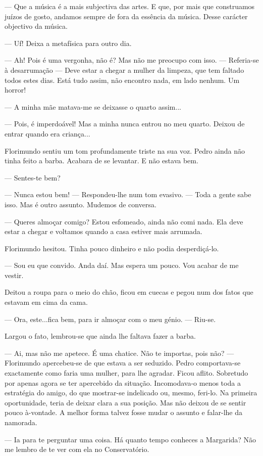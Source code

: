 --- Que a música é a mais subjectiva das artes. E que, por mais que
construamos juízos de gosto, andamos sempre de fora da essência da
música. Desse carácter objectivo da música.

--- Uf! Deixa a metafísica para outro dia.

--- Ah! Pois é uma vergonha, não é? Mas não me preocupo com isso. --- 
Referia-se à desarrumação --- Deve estar a chegar a mulher da limpeza, que
tem faltado todos estes dias. Está tudo assim, não encontro nada, em
lado nenhum. Um horror!

--- A minha mãe matava-me se deixasse o quarto assim...

--- Pois, é imperdoável! Mas a minha nunca entrou no meu quarto. Deixou de
entrar quando era criança...

Florimundo sentiu um tom profundamente triste na sua voz. Pedro ainda
não tinha feito a barba. Acabara de se levantar. E não estava bem.

--- Sentes-te bem?

--- Nunca estou bem! --- Respondeu-lhe num tom evasivo. --- Toda a gente sabe
isso. Mas é outro assunto. Mudemos de conversa.

--- Queres almoçar comigo? Estou esfomeado, ainda não comi nada. Ela deve
estar a chegar e voltamos quando a casa estiver mais arrumada.

Florimundo hesitou. Tinha pouco dinheiro e não podia desperdiçá-lo.

--- Sou eu que convido. Anda daí. Mas espera um pouco. Vou acabar de me
vestir.

Deitou a roupa para o meio do chão, ficou em cuecas e pegou num dos
fatos que estavam em cima da cama.

--- Ora, este...fica bem, para ir almoçar com o meu génio. --- Riu-se.

Largou o fato, lembrou-se que ainda lhe faltava fazer a barba.

--- Ai, mas não me apetece. É uma chatice. Não te importas, pois não? ---
Florimundo apercebeu-se de que estava a ser seduzido. Pedro
comportava-se exactamente como faria uma mulher, para lhe agradar. Ficou
aflito. Sobretudo por apenas agora se ter apercebido da situação.
Incomodava-o menos toda a estratégia do amigo, do que mostrar-se
indelicado ou, mesmo, feri-lo. Na primeira oportunidade, teria de deixar
clara a sua posição. Mas não deixou de se sentir pouco à-vontade. A
melhor forma talvez fosse mudar o assunto e falar-lhe da namorada.

--- Ia para te perguntar uma coisa. Há quanto tempo conheces a Margarida?
Não me lembro de te ver com ela no Conservatório.

